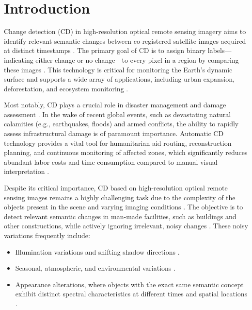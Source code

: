 \documentclass[conference]{IEEEtran}
\begin{document}
\section{Introduction}

Change detection (CD) in high-resolution optical remote sensing imagery aims to identify relevant semantic changes between co-registered satellite images acquired at distinct timestamps \cite{scratchformer2024}. The primary goal of CD is to assign binary labels—indicating either change or no change—to every pixel in a region by comparing these images \cite{bit2021}. This technology is critical for monitoring the Earth's dynamic surface and supports a wide array of applications, including urban expansion, deforestation, and ecosystem monitoring \cite{bit2021, scratchformer2024}. 

Most notably, CD plays a crucial role in disaster management and damage assessment \cite{bit2021, scratchformer2024}. In the wake of recent global events, such as devastating natural calamities (e.g., earthquakes, floods) and armed conflicts, the ability to rapidly assess infrastructural damage is of paramount importance. Automatic CD technology provides a vital tool for humanitarian aid routing, reconstruction planning, and continuous monitoring of affected zones, which significantly reduces abundant labor costs and time consumption compared to manual visual interpretation \cite{bit2021}.

Despite its critical importance, CD based on high-resolution optical remote sensing images remains a highly challenging task due to the complexity of the objects present in the scene and varying imaging conditions \cite{bit2021}. The objective is to detect relevant semantic changes in man-made facilities, such as buildings and other constructions, while actively ignoring irrelevant, noisy changes \cite{scratchformer2024}. These noisy variations frequently include:
\begin{itemize}
    \item Illumination variations and shifting shadow directions \cite{scratchformer2024}.
    \item Seasonal, atmospheric, and environmental variations \cite{scratchformer2024}.
    \item Appearance alterations, where objects with the exact same semantic concept exhibit distinct spectral characteristics at different times and spatial locations \cite{bit2021}.
\end{itemize}
\end{document}
